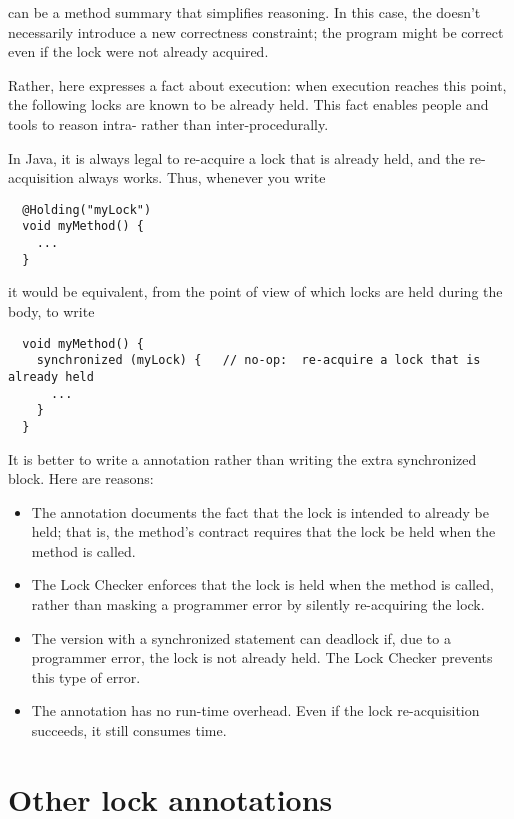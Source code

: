    can be a method summary that simplifies reasoning.  In
  this case, the  doesn't necessarily introduce a new
  correctness constraint; the program might be correct even if the lock
  were not already acquired.

  Rather, here  expresses a fact about execution:  when
  execution reaches this point, the following locks are known to be already held.  This
  fact enables people and tools to reason intra- rather than
  inter-procedurally.

  In Java, it is always legal to re-acquire a lock that is already held,
  and the re-acquisition always works.  Thus, whenever you write

\begin{Verbatim}
  @Holding("myLock")
  void myMethod() {
    ...
  }
\end{Verbatim}

\noindent
it would be equivalent, from the point of view of which locks are held
during the body, to write

\begin{Verbatim}
  void myMethod() {
    synchronized (myLock) {   // no-op:  re-acquire a lock that is already held
      ...
    }
  }
\end{Verbatim}


It is better to write a  annotation rather than writing the
extra synchronized block.  Here are reasons:

\begin{itemize}
\item
  The annotation documents the fact that the lock is intended to already be
  held;  that is, the method's contract requires that the lock be held when
  the method is called.
\item
  The Lock Checker enforces that the lock is held when the method is
  called, rather than masking a programmer error by silently re-acquiring
  the lock.
\item
  The version with a synchronized statement can deadlock if, due to a programmer error,
  the lock is not already held.  The Lock Checker prevents this type of
  error.
\item
  The annotation has no run-time overhead.  Even if the lock re-acquisition
  succeeds, it still consumes time.
\end{itemize}


\section{Other lock annotations\label{lock-other-annotations}}

